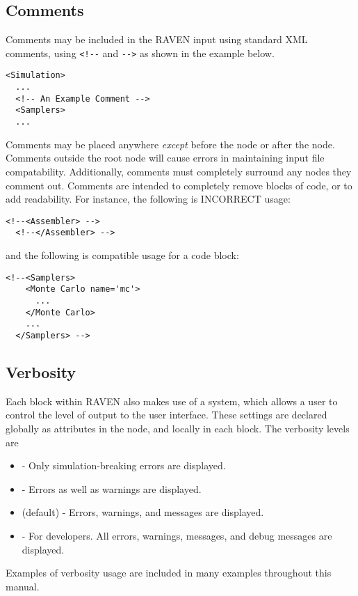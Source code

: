 \subsection{Comments}
Comments may be included in the RAVEN input using standard XML comments,
using \verb|<!--| and \verb|-->| as shown in the example below.
\begin{lstlisting}[style=XML]
<Simulation>
  ...
  <!-- An Example Comment -->
  <Samplers>
  ...
\end{lstlisting}
Comments may be placed anywhere \emph{except} before the 
node or after the  node.
%
Comments outside the root node will cause errors in maintaining input file
compatability.
%
Additionally, comments must completely surround any nodes they comment out.
%
Comments are intended to completely remove blocks of code, or to add readability.
%
For instance, the following is INCORRECT usage:
\begin{lstlisting}[style=XML]
  <!--<Assembler> -->
  <!--</Assembler> -->
\end{lstlisting}
%
and the following is compatible usage for a code block:
%
\begin{lstlisting}[style=XML]
  <!--<Samplers>
    <Monte Carlo name='mc'>
      ...
    </Monte Carlo>
    ...
  </Samplers> -->
\end{lstlisting}


\subsection{Verbosity}
Each block within RAVEN also makes use of a  system,
which allows a user to control the level of output to the user interface.
These settings are declared globally as attributes in the  node,
and locally in each block.  The verbosity levels are
\begin{itemize}
\item {} - Only simulation-breaking errors are displayed.
\item {} - Errors as well as warnings are displayed.
\item {} (default) - Errors, warnings, and messages are displayed.
\item {} - For developers. All errors, warnings, messages, and debug messages are displayed.
\end{itemize}
Examples of verbosity usage are included in many examples throughout this manual.


